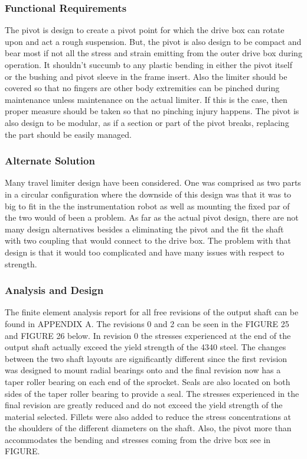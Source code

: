 \subsubsection{Functional Requirements}

The pivot is design to create a pivot point for which the drive box can rotate upon and act a rough suspension. But, the pivot is also design to be compact and bear most if not all the stress and strain emitting from the outer drive box during operation. It shouldn't succumb to any plastic bending in either the pivot itself or the bushing and pivot sleeve in the frame insert. Also the limiter should be covered so that no fingers are other body extremities can be pinched during maintenance unless maintenance on the actual limiter. If this is the case, then proper measure should be taken so that no pinching injury happens. The pivot is also design to be modular, as if a section or part of the pivot breaks, replacing the part should be easily managed. 

\subsubsection{Alternate Solution}

Many travel limiter design have been considered. One was comprised as two parts in a circular configuration where the downside of this design was that it was to big to fit in the the instrumentation robot as well as mounting the fixed par of the two would of been a problem. As far as the actual pivot design, there are not many design alternatives besides a eliminating the pivot and the fit the shaft with two coupling that would connect to the drive box. The problem with that design is that it would too complicated and have many issues with respect to strength. 


\subsubsection{Analysis and Design}

The finite element analysis report for all free revisions of the output shaft can be found in APPENDIX A.  The revisions 0 and 2 can be seen in the FIGURE 25 and FIGURE 26 below. In revision 0 the stresses experienced at the end of the output shaft actually exceed the yield strength of the 4340 steel. The changes between the two shaft layouts are significantly different since the first revision was designed to mount radial bearings onto and the final revision now has a taper roller bearing on each end of the sprocket. Seals are also located on both sides of the taper roller bearing to provide a seal. The stresses experienced in the final revision are greatly reduced and do not exceed the yield strength of the material selected. Fillets were also added to reduce the stress concentrations at the shoulders of the different diameters on the shaft. Also, the pivot more than accommodates the bending and stresses coming from the drive box see in FIGURE.
